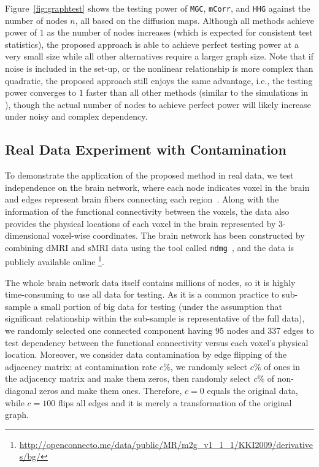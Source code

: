 \documentclass[12pt]{article}
\theoremstyle{definition}
\begin{document}
	Figure~\ref{fig:graphtest} shows the testing power of \texttt{MGC}, \texttt{mCorr}, and \texttt{HHG} against the number of nodes $n$, all based on the diffusion maps. Although all methods achieve power of $1$ as the number of nodes increases (which is expected for consistent test statistics), the proposed approach is able to achieve perfect testing power at a very small size while all other alternatives require a larger graph size. Note that if noise is included in the set-up, or the nonlinear relationship is more complex than quadratic, the proposed approach still enjoys the same advantage, i.e., the testing power converges to $1$ faster than all other methods (similar to the simulations in \cite{shen2016discovering}), though the actual number of nodes to achieve perfect power will likely increase under noisy and complex dependency.
	
	
	\subsection{Real Data Experiment with Contamination}
	\label{ssec:real}
	
	To demonstrate the application of the proposed method in real data, we test independence on the brain network, where each node indicates voxel in the brain and edges represent brain fibers connecting each region~\citep{kiar2016ndmg}. Along with the information of the functional connectivity between the voxels, the data also provides the physical locations of each voxel in the brain represented by 3-dimensional voxel-wise coordinates. The brain network has been constructed by combining dMRI and sMRI data using the tool called \texttt{ndmg}~\citep{kiar2016science}, and the data is publicly available online \footnote{\url{http://openconnecto.me/data/public/MR/m2g_v1_1_1/KKI2009/derivatives/bg/}}.
	
	The whole brain network data itself contains millions of nodes, so it is highly time-consuming to use all data for testing. As it is a common practice to sub-sample a small portion of big data for testing (under the assumption that significant relationship within the sub-sample is representative of the full data), we randomly selected one connected component having 95 nodes and 337 edges to test dependency between the functional connectivity versus each voxel's physical location. Moreover, we consider data contamination by edge flipping of the adjacency matrix: at contamination rate $c \%$, we randomly select $c \%$ of ones in the adjacency matrix and make them zeros, then randomly select $c \%$ of non-diagonal zeros and make them ones. Therefore, $c=0$ equals the original data, while $c=100$ flips all edges and it is merely a transformation of the original graph.
	
\end{document}
